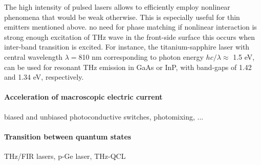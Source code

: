 The high intensity of pulsed lasers allows to efficiently employ nonlinear phenomena that would be weak otherwise. This is especially useful for thin emitters mentioned above. 
no need for phase matching if nonlinear interaction is strong enough excitation of THz wave in the front-side surface
this occurs when inter-band transition is excited. For instance, the titanium-sapphire laser with central wavelength $\lambda = $810 nm corresponding to photon energy $hc/\lambda \approx$ 1.5 eV, can be used for resonant THz emission in GaAs or InP, with band-gaps of 1.42 and 1.34 eV, respectively.



\paragraph{Acceleration of macroscopic electric current}
 biased and unbiased photoconductive switches, photomixing, ...

\paragraph{Transition between quantum states}
 THz/FIR lasers, p-Ge laser, THz-QCL

